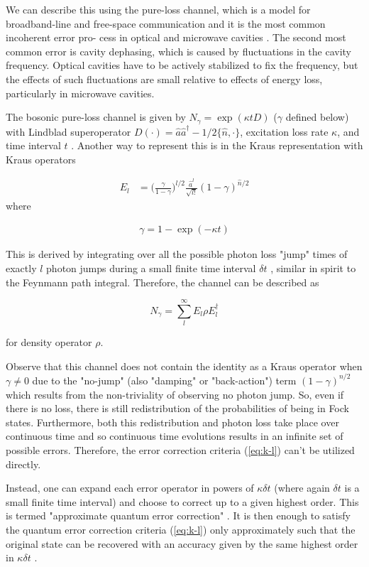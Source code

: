 \documentclass[12]{amsart}
\newcommand\0{\mathbf{0}}
\newcommand\<{\langle}
\renewcommand\>{\rangle}
\begin{document}
We can describe this using the pure-loss channel, which is a model for broadband-line and free-space communication and it is the most common incoherent error pro- cess in optical and microwave cavities \cite{albert2017performance}. The second most common error is cavity dephasing, which is caused by fluctuations in the cavity frequency. Optical cavities have to be actively stabilized to fix the frequency, but the effects of such fluctuations are small relative to effects of energy loss, particularly in microwave cavities. 

The bosonic pure-loss channel is given by $N_\gamma = \exp(\kappa t D)$ ($\gamma$ defined below) with Lindblad superoperator $D(\cdot) = \hat{a} \hat{a}^\dag - 1/2 \{ \hat{n} , \cdot \}$, excitation loss rate $\kappa$,  and time interval $t$ \cite{albert2017performance}. Another way to represent this is in the Kraus representation with Kraus operators

\begin{align}
\label{eq:kraus}
E_l &= \Big(\frac{\gamma}{1-\gamma}\Big)^{l / 2} \frac{\hat{a}^l}{\sqrt{l!}}(1 - \gamma)^{\hat{n} / 2}
\end{align}
where

\begin{align}
\label{eq:gamma}
	\gamma = 1 - \exp(- \kappa t)
\end{align}

This is derived by integrating over all the possible photon loss "jump" times of exactly $l$ photon jumps during a small finite time interval $\delta t$ \cite{chuang1997bosonic}, similar in spirit to the Feynmann path integral. Therefore, the channel can be described as 

$$
N_\gamma = \sum_l^\infty E_l \rho E_l^\dag
$$

for density operator $\rho$.

Observe that this channel does not contain the identity as a Kraus operator when $\gamma \neq 0$ due to the "no-jump" (also "damping" or "back-action") term $(1-\gamma)^{n / 2}$ which results from the non-triviality of observing no photon jump. So, even if there is no loss, there is still redistribution of the probabilities of being in Fock states. Furthermore, both this redistribution and photon loss take place over continuous time and so continuous time evolutions results in an infinite set of possible errors. Therefore, the error correction criteria (\ref{eq:k-l}) can't be utilized directly. 

Instead, one can expand each error operator in powers of $\kappa \delta t$ (where again $\delta t$ is a small finite time interval) and choose to correct up to a given highest order. This is termed "approximate quantum error correction" \cite{mandayam2012towards}. It is then enough to satisfy the quantum error correction criteria (\ref{eq:k-l}) only approximately such that the original state can be recovered with an accuracy given by the same highest order in $\kappa \delta t$ \cite{michael2016new}.
\end{document}
